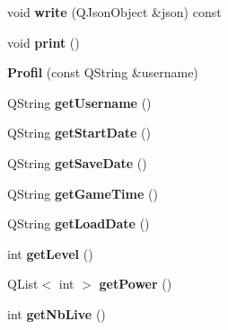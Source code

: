 \begin{DoxyCompactItemize}
\item 
\hypertarget{class_profil_a0c07c8aaf3e8b1fee2aeb5ee226f4206}{}void {\bfseries write} (Q\+Json\+Object \&json) const \label{class_profil_a0c07c8aaf3e8b1fee2aeb5ee226f4206}

\item 
\hypertarget{class_profil_a6c2dd8fc5f5604ce12959982309eed42}{}void {\bfseries print} ()\label{class_profil_a6c2dd8fc5f5604ce12959982309eed42}

\item 
\hypertarget{class_profil_ad874b5e5885c947739f7dfa8a8932442}{}{\bfseries Profil} (const Q\+String \&username)\label{class_profil_ad874b5e5885c947739f7dfa8a8932442}

\item 
\hypertarget{class_profil_af0ab359fbf8feb7e703293c9025e8d36}{}Q\+String {\bfseries get\+Username} ()\label{class_profil_af0ab359fbf8feb7e703293c9025e8d36}

\item 
\hypertarget{class_profil_aa51ac79c413e575f32166eac7694c313}{}Q\+String {\bfseries get\+Start\+Date} ()\label{class_profil_aa51ac79c413e575f32166eac7694c313}

\item 
\hypertarget{class_profil_a9858f08dfaff3155450e2f2a66ae50cf}{}Q\+String {\bfseries get\+Save\+Date} ()\label{class_profil_a9858f08dfaff3155450e2f2a66ae50cf}

\item 
\hypertarget{class_profil_a8c75d1768cb705d48d8d1f0519512e55}{}Q\+String {\bfseries get\+Game\+Time} ()\label{class_profil_a8c75d1768cb705d48d8d1f0519512e55}

\item 
\hypertarget{class_profil_a9755d065b6f920862fdf642af15c7a7d}{}Q\+String {\bfseries get\+Load\+Date} ()\label{class_profil_a9755d065b6f920862fdf642af15c7a7d}

\item 
\hypertarget{class_profil_a5fd30de19283f6ae22a7232dd22e2afa}{}int {\bfseries get\+Level} ()\label{class_profil_a5fd30de19283f6ae22a7232dd22e2afa}

\item 
\hypertarget{class_profil_ac5d441d6e98d8faf163e48a8d1119c01}{}Q\+List$<$ int $>$ {\bfseries get\+Power} ()\label{class_profil_ac5d441d6e98d8faf163e48a8d1119c01}

\item 
\hypertarget{class_profil_a4747a4a9cf7d22203bc316f3a0753033}{}int {\bfseries get\+Nb\+Live} ()\label{class_profil_a4747a4a9cf7d22203bc316f3a0753033}


\end{DoxyCompactItemize}
